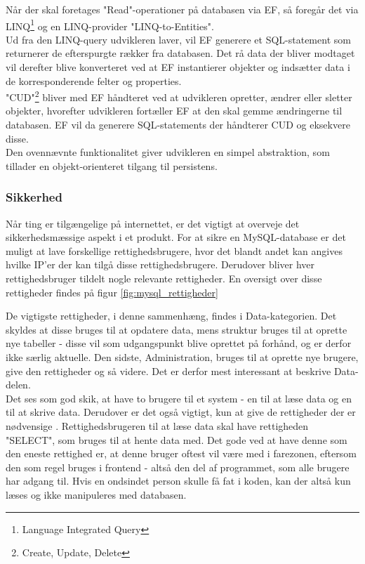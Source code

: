 Når der skal foretages "Read"\mbox{}-operationer på databasen via EF, så foregår det via LINQ\footnote{Language Integrated Query}\cite{linq} og en LINQ-provider "LINQ-to-Entities"\mbox{}\cite{linqtoentities}.\\
Ud fra den LINQ-query udvikleren laver, vil EF generere et SQL-statement som returnerer de efterspurgte rækker fra databasen. Det rå data der bliver modtaget vil derefter blive konverteret ved at EF instantierer objekter og indsætter data i de korresponderende felter og properties.\\
"CUD"\footnote{Create, Update, Delete} bliver med EF håndteret ved at udvikleren opretter, ændrer eller sletter objekter, hvorefter udvikleren fortæller EF at den skal gemme ændringerne til databasen. EF vil da generere SQL-statements der håndterer CUD og eksekvere disse.\\

Den ovennævnte funktionalitet giver udvikleren en simpel abstraktion, som tillader en objekt-orienteret tilgang til persistens.

\subsubsection{Sikkerhed}
Når ting er tilgængelige på internettet, er det vigtigt at overveje det sikkerhedsmæssige aspekt i et produkt. For at sikre en MySQL-database er det muligt at lave forskellige rettighedsbrugere, hvor det blandt andet kan angives hvilke IP'er der kan tilgå disse rettighedsbrugere. Derudover bliver hver rettighedsbruger tildelt nogle relevante rettigheder. En oversigt over disse rettigheder findes på figur \ref{fig:mysql_rettigheder}


De vigtigste rettigheder, i denne sammenhæng, findes i Data-kategorien. Det skyldes at disse bruges til at opdatere data, mens struktur bruges til at oprette nye tabeller - disse vil som udgangspunkt blive oprettet på forhånd, og er derfor ikke særlig aktuelle. Den sidste, Administration, bruges til at oprette nye brugere, give den rettigheder og så videre. Det er derfor mest interessant at beskrive Data-delen.\\

Det ses som god skik, at have to brugere til et system - en til at læse data og en til at skrive data. Derudover er det også vigtigt, kun at give de rettigheder der er nødvensige \cite{mysql_goodpractice}. Rettighedsbrugeren til at læse data skal have rettigheden "SELECT", som bruges til at hente data med. Det gode ved at have denne som den eneste rettighed er, at denne bruger oftest vil være med i farezonen, eftersom den som regel bruges i frontend - altså den del af programmet, som alle brugere har adgang til. Hvis en ondsindet person skulle få fat i koden, kan der altså kun læses og ikke manipuleres med databasen. \\

